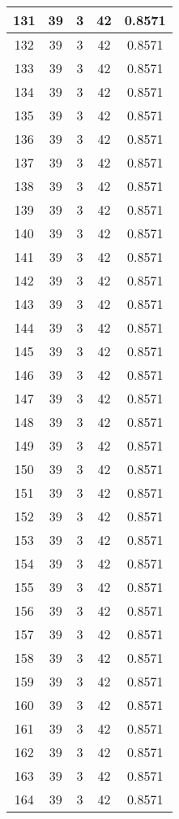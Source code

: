 \documentclass[letterpaper, 12pt]{article}
\begin{document}
\begin{longtable}{|c|c|c|c|c|}
\hline
131 & 39 & 3 & 42 & 0.8571 \\
\hline
132 & 39 & 3 & 42 & 0.8571 \\
\hline
133 & 39 & 3 & 42 & 0.8571 \\
\hline
134 & 39 & 3 & 42 & 0.8571 \\
\hline
135 & 39 & 3 & 42 & 0.8571 \\
\hline
136 & 39 & 3 & 42 & 0.8571 \\
\hline
137 & 39 & 3 & 42 & 0.8571 \\
\hline
138 & 39 & 3 & 42 & 0.8571 \\
\hline
139 & 39 & 3 & 42 & 0.8571 \\
\hline
140 & 39 & 3 & 42 & 0.8571 \\
\hline
141 & 39 & 3 & 42 & 0.8571 \\
\hline
142 & 39 & 3 & 42 & 0.8571 \\
\hline
143 & 39 & 3 & 42 & 0.8571 \\
\hline
144 & 39 & 3 & 42 & 0.8571 \\
\hline
145 & 39 & 3 & 42 & 0.8571 \\
\hline
146 & 39 & 3 & 42 & 0.8571 \\
\hline
147 & 39 & 3 & 42 & 0.8571 \\
\hline
148 & 39 & 3 & 42 & 0.8571 \\
\hline
149 & 39 & 3 & 42 & 0.8571 \\
\hline
150 & 39 & 3 & 42 & 0.8571 \\
\hline
151 & 39 & 3 & 42 & 0.8571 \\
\hline
152 & 39 & 3 & 42 & 0.8571 \\
\hline
153 & 39 & 3 & 42 & 0.8571 \\
\hline
154 & 39 & 3 & 42 & 0.8571 \\
\hline
155 & 39 & 3 & 42 & 0.8571 \\
\hline
156 & 39 & 3 & 42 & 0.8571 \\
\hline
157 & 39 & 3 & 42 & 0.8571 \\
\hline
158 & 39 & 3 & 42 & 0.8571 \\
\hline
159 & 39 & 3 & 42 & 0.8571 \\
\hline
160 & 39 & 3 & 42 & 0.8571 \\
\hline
161 & 39 & 3 & 42 & 0.8571 \\
\hline
162 & 39 & 3 & 42 & 0.8571 \\
\hline
163 & 39 & 3 & 42 & 0.8571 \\
\hline
164 & 39 & 3 & 42 & 0.8571 \\

\end{longtable}
\end{document}
